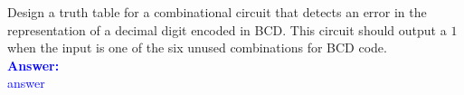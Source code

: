 \item{}
Design a truth table for a combinational circuit that detects an error in the
representation of a decimal digit encoded in BCD. This circuit should output
a $1$ when the input is one of the six unused combinations for BCD code.\\[12pt]
\ifanswers
\textcolor{blue}{
\textbf{Answer:}\\
answer
}
\newpage
\fi

